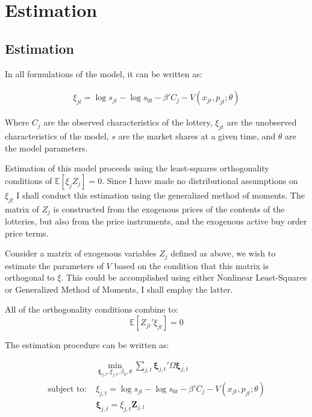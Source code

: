 \documentclass[12pt]{paper}
\newcommand{\exV}[1]{\mathbb{E} \left [ #1 \right ]}
\begin{document}
\section{Estimation}

\subsection{Estimation}

In all formulations of the model, it can be written as:

\begin{align*}
  \xi_{jt} = \log s_{jt} - \log s_{0t} - \beta' C_j - V( x_{jt}, p_{jt}; \theta)
\end{align*}

Where $C_j$ are the observed characteristics of the lottery, $\xi_{jt}$
are the unobserved characteristics of the model, $s$ are the market
shares at a given time, and $\theta$ are the model parameters.

Estimation of this model proceeds using the least-squares
orthogonality conditions of $\exV{\xi_j Z_j} = 0$. Since I have made
no distributional assumptions on $\xi_{jt}$ I shall conduct this
estimation using the generalized method of moments. The matrix of
$Z_j$ is constructed from the exogenous prices of the contents of the
lotteries, but also from the price instruments, and the exogenous
active buy order price terms. 

Consider a matrix of exogenous variables $Z_j$ defined as above, we wish
to estimate the parameters of $V$ based on the condition that this
matrix is orthogonal to $\xi$. This could be accomplished using either
Nonlinear Least-Squares or Generalized Method of Moments, I shall
employ the latter.

All of the orthogonality conditions combine to:
\begin{equation*}
  \exV{Z_{jt}'\xi_{jt}} = 0
\end{equation*}

The estimation procedure can be written as:

\begin{align}
  &\min_{\bm{\xi}_{j,t}, \xi_{j,t}, \beta_0, \theta} \sum_{j,t}\bm{\xi}_{j,t}' \Omega \bm{\xi}_{j,t}\\
  \text{subject to: } &\xi_{j,t} = \log s_{jt} - \log s_{0t} - \beta'C_j
                        - V( x_{jt}, p_{jt}; \theta)\\
  &\bm{\xi}_{j,t} = \xi_{j,t} \bm{Z}_{j,t}  
\end{align}
\end{document}
